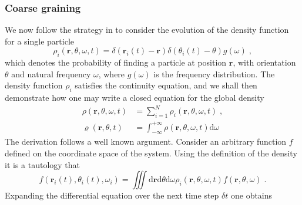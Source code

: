 \documentclass{article}
\begin{document}
\subsubsection{Coarse graining}
We now follow the strategy in \cite{DavidSDean_1996} to consider the evolution of the density function for a single particle
\begin{equation}
    \rho _i\left( \mathbf{r},\theta ,\omega ,t \right) =\delta \left( \mathbf{r}_i\left( t \right) -\mathbf{r} \right) \delta \left( \theta _i\left( t \right) -\theta \right) g \left( \omega \right)\;, 
\end{equation}
which denotes the probability of finding a particle at position $\mathbf{r}$, with orientation $\theta$ and natural frequency $\omega$, where $g\left( \omega \right)$ is the frequency distribution. The density function $\rho _i$ satisfies the continuity equation, and we shall then demonstrate how one may write a closed equation for the global density
\begin{subequations}
    \begin{align}
        \rho \left( \mathbf{r},\theta ,\omega ,t \right) &=\sum_{i=1}^N{\rho _i\left( \mathbf{r},\theta ,\omega ,t \right)}\;,\\
        \varrho \left( \mathbf{r},\theta ,t \right) &=\int_{-\infty}^{+\infty}{\rho \left( \mathbf{r},\theta ,\omega ,t \right) \mathrm{d}\omega}
    \end{align}
\end{subequations}
The derivation follows a well known argument. Consider an arbitrary function $f$ defined on the coordinate space of the system. Using the definition of the density it is a tautology
that
\begin{equation}
    \label{eq:arbitraryFunction}
    f\left( \mathbf{r}_i\left( t \right) ,\theta _i\left( t \right) ,\omega _i \right) =\iiint{\text{d}\mathbf{r}\text{d}\theta \text{d}\omega \rho _i\left( \mathbf{r},\theta ,\omega ,t \right) f\left( \mathbf{r},\theta ,\omega \right)}\;.
\end{equation}
Expanding the differential equation over the next time step $\delta t$ one obtains
\end{document}
